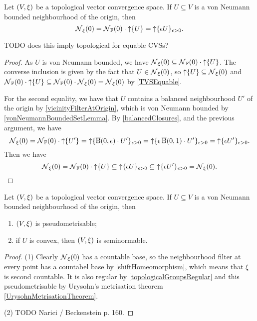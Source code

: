 \begin{lemma} \label{boundedSetVicinityBase}
Let $\sSet{V,\xi}$ be a topological vector convergence space. If $U\subseteq V$ is a von Neumann bounded neighbourhood of the origin, then
\[ \operatorname{\mathcal{N}}_\xi(0) = \operatorname{\mathcal{N}}_{\mathbb{F}}(0) \cdot\operatorname{\uparrow}\{U\} = \operatorname{\uparrow}\{\epsilon U\}_{\epsilon >0}. \]
\end{lemma}
TODO does this imply topological for equable CVSs?
\begin{proof}
As $U$ is von Neumann bounded, we have $\operatorname{\mathcal{N}}_\xi(0) \subseteq \operatorname{\mathcal{N}}_{\mathbb{F}}(0) \cdot \operatorname{\uparrow}\{U\}$. The converse inclusion is given by the fact that $U\in \operatorname{\mathcal{N}}_\xi(0)$, so $\operatorname{\uparrow}\{U\}\subseteq \operatorname{\mathcal{N}}_\xi(0)$ and $\operatorname{\mathcal{N}}_{\mathbb{F}}(0) \cdot \operatorname{\uparrow}\{U\} \subseteq \operatorname{\mathcal{N}}_{\mathbb{F}}(0) \cdot\operatorname{\mathcal{N}}_\xi(0) = \operatorname{\mathcal{N}}_\xi(0)$ by \ref{TVSEquable}.

For the second equality, we have that $U$ contains a balanced neighbourhood $U'$ of the origin by \ref{vicinityFilterAtOrigin}, which is von Neumann bounded by \ref{vonNeumannBoundedSetLemma}. By \ref{balancedClosures}, and the previous argument, we have
\[ \operatorname{\mathcal{N}}_\xi(0) = \operatorname{\mathcal{N}}_{\mathbb{F}}(0) \cdot\operatorname{\uparrow}\{U'\} = \operatorname{\uparrow} \{\operatorname{\overline{B}}(0,\epsilon)\cdot U'\}_{\epsilon > 0} = \operatorname{\uparrow} \{\epsilon\operatorname{\overline{B}}(0,1)\cdot U'\}_{\epsilon > 0} = \operatorname{\uparrow} \{\epsilon U'\}_{\epsilon > 0}. \]
Then we have
\[ \operatorname{\mathcal{N}}_\xi(0) = \operatorname{\mathcal{N}}_{\mathbb{F}}(0) \cdot\operatorname{\uparrow}\{U\} \subseteq \operatorname{\uparrow} \{\epsilon U\}_{\epsilon > 0} \subseteq \operatorname{\uparrow} \{\epsilon U'\}_{\epsilon > 0} = \operatorname{\mathcal{N}}_\xi(0). \]
\end{proof}
\begin{corollary} \label{metrisableBoundedNeighbourhood}
Let $\sSet{V,\xi}$ be a topological vector convergence space. If $U\subseteq V$ is a von Neumann bounded neighbourhood of the origin, then
\begin{enumerate}
\item $\sSet{V,\xi}$ is pseudometrisable;
\item if $U$ is convex, then $\sSet{V,\xi}$ is seminormable.
\end{enumerate}
\end{corollary}
\begin{proof}
(1) Clearly $\operatorname{\mathcal{N}}_\xi(0)$ has a countable base, so the neighbourhood filter at every point has a countabel base by \ref{shiftHomeomorphism}, which means that $\xi$ is second countable. It is also regular by \ref{topologicalGroupsRegular} and this pseudometrisable by Urysohn's metrisation theorem \ref{UrysohnMetrisationTheorem}.

(2) TODO Narici / Beckenstein p. 160.
\end{proof}

